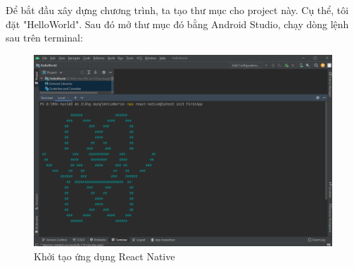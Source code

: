Để bắt đầu xây dựng chương trình, ta tạo thư mục cho project này. Cụ thể, tôi đặt "HelloWorld". Sau đó mở thư mục đó bằng Android Studio, chạy dòng lệnh sau trên terminal:
\begin{figure}[!ht]
    \centering
    \includegraphics[width=1\textwidth]{images/createFirstApp.png}
    \caption{Khởi tạo ứng dụng React Native}
\end{figure}

